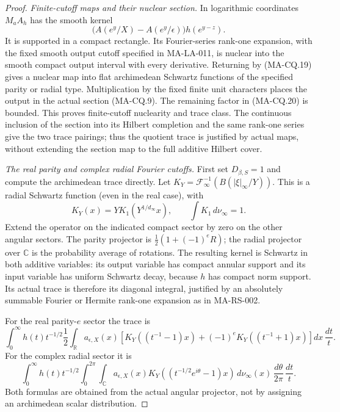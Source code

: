 \begin{proof}
\emph{Finite-cutoff maps and their nuclear section.}
In logarithmic coordinates $M_aA_h$ has the
smooth kernel
\[
 \bigl(A(e^y/X)-A(e^y/\epsilon)\bigr)h(e^{y-z}).
\tag{MA-CQ.24}
\]
It is supported in a compact rectangle.
Its Fourier-series rank-one expansion, with the
fixed smooth output cutoff specified in
MA-LA-011, is nuclear into the smooth compact
output interval with every derivative.
Returning by (MA-CQ.19) gives a nuclear map
into flat archimedean Schwartz functions of
the specified parity or radial type.
Multiplication by the fixed finite unit
characters places the output in the actual
section (MA-CQ.9).
The remaining factor in (MA-CQ.20) is bounded.
This proves finite-cutoff nuclearity and trace
class.  The continuous inclusion of the section
into its Hilbert completion and the same
rank-one series give the two trace pairings;
thus the quotient trace is justified by
actual maps, without extending the section
map to the full additive Hilbert cover.

\emph{The real parity and complex radial Fourier cutoffs.}
First set $D_{\beta,S}=1$ and compute the
archimedean trace directly.
Let
$K_Y=\mathcal F_\infty^{-1}(B(|\xi|_\infty/Y))$.
This is a radial Schwartz function (even in
the real case), with
\[
 K_Y(x)=Y K_1(Y^{1/d_\infty}x),
                         \qquad \int K_1\,d\nu_\infty=1.
\tag{MA-CQ.25}
\]
Extend the operator on the indicated compact
sector by zero on the other angular sectors.
The parity projector is
$\frac12(1+(-1)^e R)$; the radial projector
over $\mathbb C$ is the probability average
of rotations.
The resulting kernel is Schwartz in both
additive variables: its output variable has
compact annular support and its input
variable has uniform Schwartz decay, because
$h$ has compact norm support.
Its actual trace is therefore its diagonal
integral, justified by an absolutely
summable Fourier or Hermite rank-one
expansion as in MA-RS-002.

For the real parity-$e$ sector the trace is
\[
 \int_0^\infty h(t)t^{-1/2}
    \frac12\int_{\mathbb R}a_{\epsilon,X}(x)
       \left[
        K_Y((t^{-1}-1)x)
        +(-1)^eK_Y((t^{-1}+1)x)
       \right]dx\,\frac{dt}{t}.
\tag{MA-CQ.26}
\]
For the complex radial sector it is
\[
 \int_0^\infty h(t)t^{-1/2}
    \int_0^{2\pi}\int_{\mathbb C}
       a_{\epsilon,X}(x)
       K_Y((t^{-1/2}e^{i\theta}-1)x)
           \,d\nu_\infty(x)\,\frac{d\theta}{2\pi}\,\frac{dt}{t}.
\tag{MA-CQ.27}
\]
Both formulas are obtained from the actual
angular projector, not by assigning an
archimedean scalar distribution.


\end{proof}
